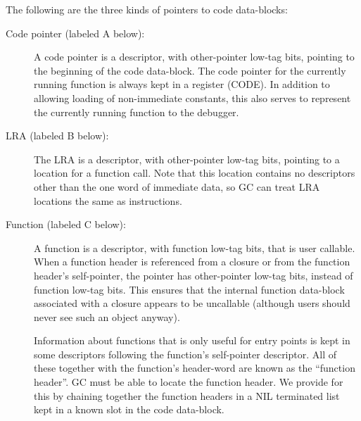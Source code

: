 The following are the three kinds of pointers to code data-blocks:
\begin{description}
   \item[Code pointer (labeled A below):]
      A code pointer is a descriptor, with other-pointer low-tag bits, pointing
      to the beginning of the code data-block.  The code pointer for the
      currently running function is always kept in a register (CODE).  In
      addition to allowing loading of non-immediate constants, this also serves
      to represent the currently running function to the debugger.
   \item[LRA (labeled B below):]
      The LRA is a descriptor, with other-pointer low-tag bits, pointing
      to a location for a function call.  Note that this location contains no
      descriptors other than the one word of immediate data, so GC can treat
      LRA locations the same as instructions.
   \item[Function (labeled C below):]
      A function is a descriptor, with function low-tag bits, that is user
      callable.  When a function header is referenced from a closure or from
      the function header's self-pointer, the pointer has other-pointer low-tag
      bits, instead of function low-tag bits.  This ensures that the internal
      function data-block associated with a closure appears to be uncallable
      (although users should never see such an object anyway).

      Information about functions that is only useful for entry points is kept
      in some descriptors following the function's self-pointer descriptor.
      All of these together with the function's header-word are known as the
      ``function header''.  GC must be able to locate the function header.  We
      provide for this by chaining together the function headers in a NIL
      terminated list kept in a known slot in the code data-block.
\end{description}

